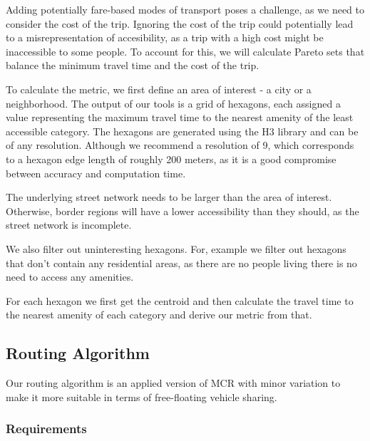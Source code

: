 Adding potentially fare-based modes of transport poses a challenge, as we need to consider the cost of the trip.
Ignoring the cost of the trip could potentially lead to a misrepresentation of accesibility, as a trip with a high cost might be inaccessible to some people.
To account for this, we will calculate Pareto sets that balance the minimum travel time and the cost of the trip.

To calculate the metric, we first define an area of interest - a city or a neighborhood.
The output of our tools is a grid of hexagons, each assigned a value representing the maximum travel time to the nearest amenity of the least accessible category.
The hexagons are generated using the H3 library  and can be of any resolution.
Although we recommend a resolution of 9, which corresponds to a hexagon edge length of roughly 200 meters, as it is a good compromise between accuracy and computation time.

The underlying street network needs to be larger than the area of interest.
Otherwise, border regions will have a lower accessibility than they should, as the street network is incomplete.

We also filter out uninteresting hexagons.
For, example we filter out hexagons that don't contain any residential areas, as there are no people living there is no need to access any amenities.

For each hexagon we first get the centroid and then calculate the travel time to the nearest amenity of each category and derive our metric from that.

\subsection{Routing Algorithm}
\label{subs:routing_algorithm}

Our routing algorithm is an applied version of MCR with minor variation to make it more suitable in terms of free-floating vehicle sharing.

\subsubsection{Requirements}
\label{subsubsec:requirements}


